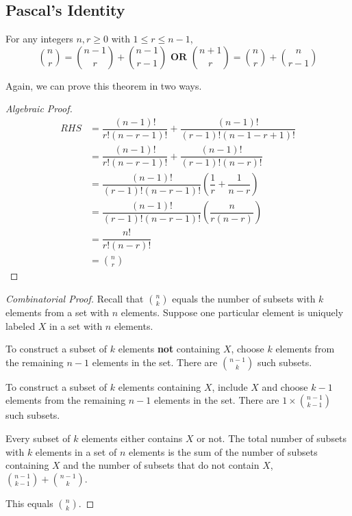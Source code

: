 \newpage
\subsection{Pascal's Identity}
\begin{theorem}
	For any integers \(n, r \geq 0\) with \(1 \leq r \leq n-1\),
	\[
		\binom{n}{r} = \binom{n-1}{r} + \binom{n-1}{r-1} \mathbf{\text{ OR }} \binom{n+1}{r} = \binom{n}{r} + \binom{n}{r-1}
	\]  
\end{theorem}

Again, we can prove this theorem in two ways.

\begin{proof}[Algebraic Proof]
	\[
		\begin{aligned}
			RHS &= \dfrac{(n-1)!}{r!(n-r-1)!} + \dfrac{(n-1)!}{(r-1)!(n-1-r+1)!} \\
			&= \dfrac{(n-1)!}{r!(n-r-1)!} + \dfrac{(n-1)!}{(r-1)!(n-r)!} \\
			&= \dfrac{(n-1)!}{(r-1)!(n-r-1)!} \left(\dfrac{1}{r} + \dfrac{1}{n-r}\right) \\
			&= \dfrac{(n-1)!}{(r-1)!(n-r-1)!} \left(\dfrac{n}{r(n-r)}\right) \\
			&= \dfrac{n!}{r!(n-r)!} \\
			&= \binom{n}{r}
		\end{aligned}
	\]
\end{proof}

\begin{proof}[Combinatorial Proof] 
	Recall that \(\binom{n}{k}\) equals the number of subsets with \(k\) elements from a set with \(n\) elements. Suppose one particular element is uniquely labeled \(X\) in a set with \(n\) elements.
	
	To construct a subset of \(k\) elements \textbf{not} containing \(X\), choose \(k\) elements from the remaining \(n-1\) elements in the set. There are \(\binom{n-1}{k}\) such subsets.
	
	To construct a subset of \(k\) elements containing \(X\), include \(X\) and choose \(k-1\) elements from the remaining \(n-1\) elements in the set. There are \(1 \times \binom{n-1}{k-1}\) such subsets.

	Every subset of \(k\) elements either contains \(X\) or not. The total number of subsets with \(k\) elements in a set of \(n\) elements is the sum of the number of subsets containing \(X\) and the number of subsets that do not contain \(X\), \(\binom{n-1}{k-1} + \binom{n-1}{k}\).

	This equals \(\binom{n}{k}\).
\end{proof}

